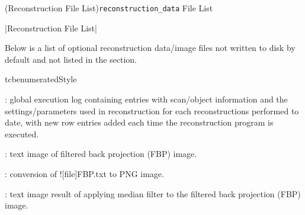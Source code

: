 \Section(Reconstruction File List){\texttt{reconstruction\_data} File List}
\begin{tcbenvironment}|Reconstruction File List|
\begin{tcbContentsBox}
\tcbsectionheaderfont Below is a list of optional reconstruction data/image files not written to disk by default and not listed in the  section.
\end{tcbContentsBox}
\begin{tcbparbox}{tcbenumeratedStyle}
\begin{fileList}
    \item {}
    \item {}
    \item {}
    \item {} : global execution log containing entries with scan/object information and the settings/parameters used in reconstruction for each reconstructions performed to date, with new row entries added each time the reconstruction program is executed.
    \item {} : text image of filtered back projection (FBP) image.
    \item {} : conversion of \docentry![file]{FBP.txt} to PNG image.
    \item {} : text image result of applying median filter to the filtered back projection (FBP) image.

\end{fileList}
\end{tcbparbox}
\end{tcbenvironment}
